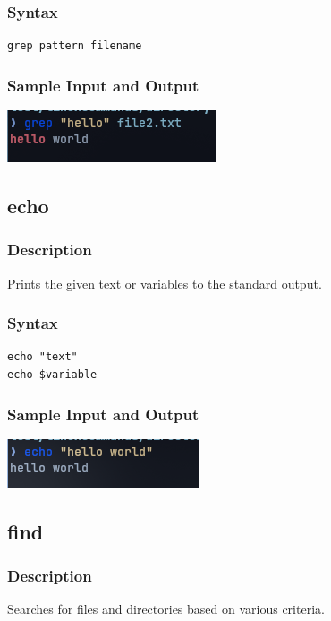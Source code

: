\subsubsection{Syntax}
\begin{verbatim}
grep pattern filename
\end{verbatim}

\subsubsection{Sample Input and Output}
\includegraphics[]{Cycle_1//Outputs/grep.png}


\subsection{echo}
\subsubsection{Description}
Prints the given text or variables to the standard output.

\subsubsection{Syntax}
\begin{verbatim}
echo "text"
echo $variable
\end{verbatim}

\subsubsection{Sample Input and Output}
\includegraphics[]{Cycle_1//Outputs/echo.png}

\subsection{find}
\subsubsection{Description}
Searches for files and directories based on various criteria.

